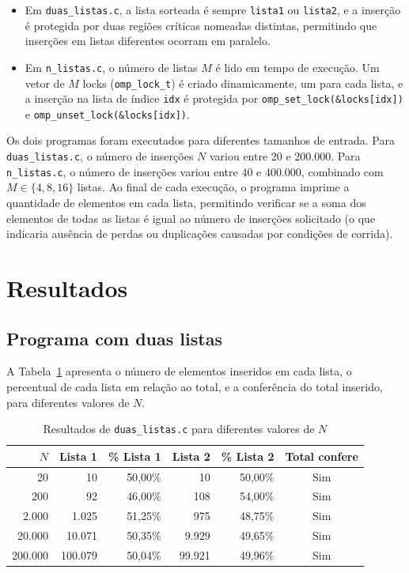 \documentclass[a4paper,12pt]{article}
\begin{document}
\begin{itemize}
    \item Em \texttt{duas\_listas.c}, a lista sorteada é 
    sempre \texttt{lista1} ou \texttt{lista2}, 
    e a inserção é protegida por duas regiões críticas nomeadas 
    distintas, permitindo que inserções em listas diferentes ocorram em paralelo.
    \item Em \texttt{n\_listas.c}, o número de listas $M$ é lido em tempo de execução. 
    Um vetor de $M$ locks (\texttt{omp\_lock\_t}) é criado dinamicamente, 
    um para cada lista, e a inserção na lista de índice \texttt{idx} 
    é protegida por \texttt{omp\_set\_lock(\&locks[idx])} e \texttt{omp\_unset\_lock(\&locks[idx])}.
\end{itemize}

Os dois programas foram executados para diferentes tamanhos de entrada. Para \texttt{duas\_listas.c}, o número de inserções $N$ variou entre 20 e 200.000. Para \texttt{n\_listas.c}, o número de inserções variou entre 40 e 400.000, combinado com $M \in \{4, 8, 16\}$ listas. Ao final de cada execução, o programa imprime a quantidade de elementos em cada lista, permitindo verificar se a soma dos elementos de todas as listas é igual ao número de inserções solicitado (o que indicaria ausência de perdas ou duplicações causadas por condições de corrida).

\section{Resultados}

\subsection{Programa com duas listas}

A Tabela~\ref{tab:duas} apresenta o número de elementos inseridos em cada lista, o percentual de cada lista em relação ao total, e a conferência do total inserido, para diferentes valores de $N$.

\begin{table}[ht]
\centering
\caption{Resultados de \texttt{duas\_listas.c} para diferentes valores de $N$}
\label{tab:duas}
\begin{tabular}{@{}rrrrrc@{}}
\toprule
$N$ & Lista 1 & \% Lista 1 & Lista 2 & \% Lista 2 & Total confere \\
\midrule
20      & 10     & 50{,}00\% & 10     & 50{,}00\% & Sim \\
200     & 92     & 46{,}00\% & 108    & 54{,}00\% & Sim \\
2.000   & 1.025  & 51{,}25\% & 975    & 48{,}75\% & Sim \\
20.000  & 10.071 & 50{,}35\% & 9.929  & 49{,}65\% & Sim \\
200.000 & 100.079& 50{,}04\% & 99.921 & 49{,}96\% & Sim \\
\bottomrule
\end{tabular}
\end{table}
\end{document}
